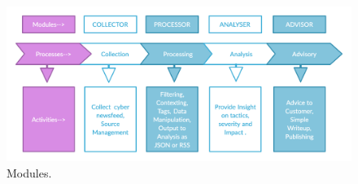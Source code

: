 \begin{figure}[ht]
    \centering
     
    \includegraphics[width=1\linewidth]{Figures/Modules.png}
     
    \caption{Modules.
    \label{fig:modules}}
  
\end{figure}
